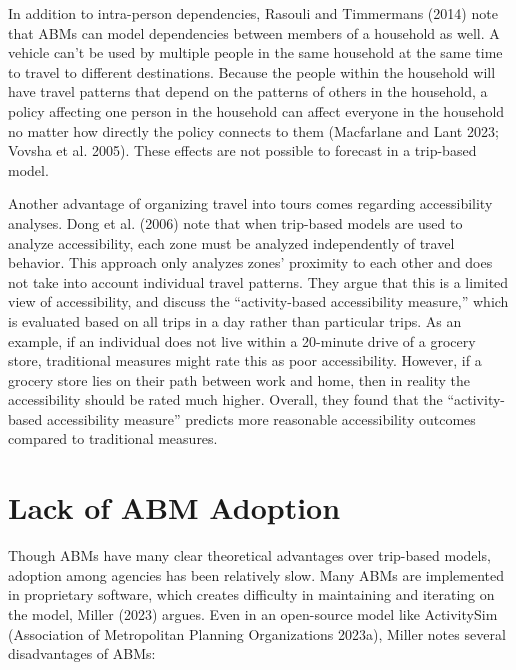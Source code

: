 \documentclass[fancy, twoside, mastersfancy, ms]{byuthesis}
\begin{document}
In addition to intra-person dependencies, Rasouli and Timmermans (2014)
note that ABMs can model dependencies between members of a household as
well. A vehicle can't be used by multiple people in the same household
at the same time to travel to different destinations. Because the people
within the household will have travel patterns that depend on the
patterns of others in the household, a policy affecting one person in
the household can affect everyone in the household no matter how
directly the policy connects to them (Macfarlane and Lant 2023; Vovsha
et al. 2005). These effects are not possible to forecast in a trip-based
model.

Another advantage of organizing travel into tours comes regarding
accessibility analyses. Dong et al. (2006) note that when trip-based
models are used to analyze accessibility, each zone must be analyzed
independently of travel behavior. This approach only analyzes zones'
proximity to each other and does not take into account individual travel
patterns. They argue that this is a limited view of accessibility, and
discuss the ``activity-based accessibility measure,'' which is evaluated
based on all trips in a day rather than particular trips. As an example,
if an individual does not live within a 20-minute drive of a grocery
store, traditional measures might rate this as poor accessibility.
However, if a grocery store lies on their path between work and home,
then in reality the accessibility should be rated much higher. Overall,
they found that the ``activity-based accessibility measure'' predicts
more reasonable accessibility outcomes compared to traditional measures.

\section{Lack of ABM Adoption}\label{sec-literature-lack-of-adpotion}

Though ABMs have many clear theoretical advantages over trip-based
models, adoption among agencies has been relatively slow. Many ABMs are
implemented in proprietary software, which creates difficulty in
maintaining and iterating on the model, Miller (2023) argues. Even in an
open-source model like ActivitySim (Association of Metropolitan Planning
Organizations 2023a), Miller notes several disadvantages of ABMs:
\end{document}
